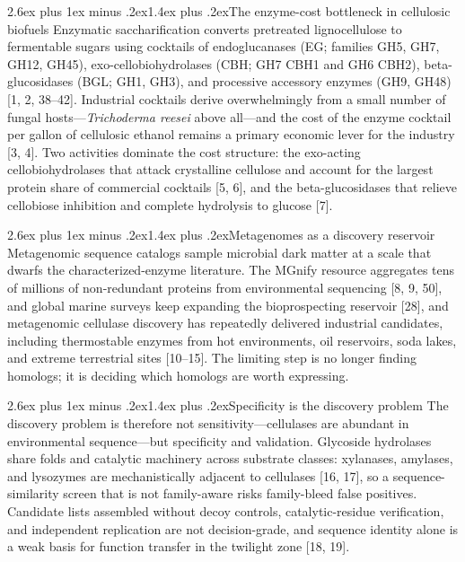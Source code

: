 \documentclass[11pt]{article}
\makeatletter
\renewcommand{\subsection}{\@startsection{subsection}{2}{\z@}%
  {2.6ex plus 1ex minus .2ex}{1.4ex plus .2ex}{\large\bfseries\color{navy}}}
\makeatother
\begin{document}
\subsection{The enzyme-cost bottleneck in cellulosic biofuels}
Enzymatic saccharification converts pretreated lignocellulose to fermentable sugars using cocktails of endoglucanases (EG; families GH5, GH7, GH12, GH45), exo-cellobiohydrolases (CBH; GH7 CBH1 and GH6 CBH2), beta-glucosidases (BGL; GH1, GH3), and processive accessory enzymes (GH9, GH48) [1, 2, 38--42]. Industrial cocktails derive overwhelmingly from a small number of fungal hosts---\textit{Trichoderma reesei} above all---and the cost of the enzyme cocktail per gallon of cellulosic ethanol remains a primary economic lever for the industry [3, 4]. Two activities dominate the cost structure: the exo-acting cellobiohydrolases that attack crystalline cellulose and account for the largest protein share of commercial cocktails [5, 6], and the beta-glucosidases that relieve cellobiose inhibition and complete hydrolysis to glucose [7].

\subsection{Metagenomes as a discovery reservoir}
Metagenomic sequence catalogs sample microbial dark matter at a scale that dwarfs the characterized-enzyme literature. The MGnify resource aggregates tens of millions of non-redundant proteins from environmental sequencing [8, 9, 50], and global marine surveys keep expanding the bioprospecting reservoir [28], and metagenomic cellulase discovery has repeatedly delivered industrial candidates, including thermostable enzymes from hot environments, oil reservoirs, soda lakes, and extreme terrestrial sites [10--15]. The limiting step is no longer finding homologs; it is deciding which homologs are worth expressing.

\subsection{Specificity is the discovery problem}
The discovery problem is therefore not sensitivity---cellulases are abundant in environmental sequence---but specificity and validation. Glycoside hydrolases share folds and catalytic machinery across substrate classes: xylanases, amylases, and lysozymes are mechanistically adjacent to cellulases [16, 17], so a sequence-similarity screen that is not family-aware risks family-bleed false positives. Candidate lists assembled without decoy controls, catalytic-residue verification, and independent replication are not decision-grade, and sequence identity alone is a weak basis for function transfer in the twilight zone [18, 19].
\end{document}
